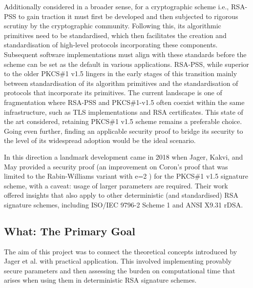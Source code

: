 \documentclass[]{final_report}
\theoremstyle{definition}
\begin{document}
Additionally considered in a broader sense, for a cryptographic scheme i.e., RSA-PSS to gain traction it must first be developed and then subjected to rigorous scrutiny by the cryptographic community. Following this, its algorithmic primitives need to be standardised, which then facilitates the creation and standardisation of high-level protocols incorporating these components. Subsequent software implementations must align with these standards before the scheme can be set as the default in various applications. RSA-PSS, while superior to the older PKCS\#1 v1.5 lingers in the early stages of this transition mainly between standardisation of its algorithm primitives and the standardisation of protocols that incorporate its primitives. The current landscape is one of fragmentation where RSA-PSS and PKCS\#1-v1.5 often coexist within the same infrastructure, such as TLS implementations and RSA certificates. This state of the art considered, retaining PKCS\#1 v1.5 scheme remains a preferable choice. Going even further, finding an applicable security proof to bridge its security to the level of its widespread adoption would be the ideal scenario.

In this direction a landmark development came in 2018 when Jager, Kakvi, and May \cite{jager2018security} provided a security proof (an improvement on Coron's proof that was limited to the Rabin-Williams variant with e=2 \cite{coron2002security}) for the PKCS\#1 v1.5 signature scheme, with a caveat: usage of larger parameters are required. Their work offered insights that also apply to other deterministic (and standardised) RSA signature schemes, including ISO/IEC 9796-2 Scheme 1 and ANSI X9.31 rDSA.

\subsection{What: The Primary Goal}
The aim of this project was to connect the theoretical concepts introduced by Jager et al. \cite{jager2018security} with practical application. This involved implementing provably secure parameters and then assessing the burden on computational time that arises when using them in deterministic RSA signature schemes.
\end{document}
